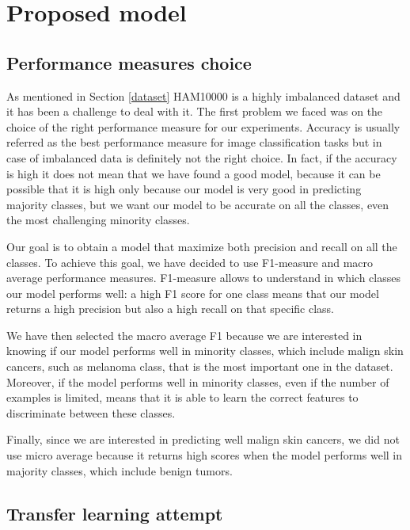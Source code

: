 \section{Proposed model} \label{proposed_model}

	\subsection{Performance measures choice}
		
		As mentioned in Section \ref{dataset} HAM10000 is a highly imbalanced dataset and it has been a challenge to deal with it. The first problem we faced was on the choice of the right performance measure for our experiments. Accuracy is usually referred as the best performance measure for image classification tasks but in case of imbalanced data is definitely not the right choice. In fact, if the accuracy is high it does not mean that we have found a good model, because it can be possible that it is high only because our model is very good in predicting majority classes, but we want our model to be accurate on all the classes, even the most challenging minority classes.
		
		\smallskip
		
		Our goal is to obtain a model that maximize both precision and recall on all the classes.
		To achieve this goal, we have decided to use F1-measure and macro average performance measures. F1-measure allows to understand in which classes our model performs well: a high F1 score for one class means that our model returns a high precision but also a high recall on that specific class. 
		
		\smallskip
		
		We have then selected the macro average F1 because we are interested in knowing if our model performs well in minority classes, which include malign skin cancers, such as melanoma class, that is the most important one in the dataset. 
		Moreover, if the model performs well in minority classes, even if the number of examples is limited, means that it is able to learn the correct features to discriminate between these classes. 
		
		\smallskip
		
		Finally, since we are interested in predicting well malign skin cancers, we did not use micro average because it returns high scores when the model performs well in majority classes, which include benign tumors.
		
	\subsection{Transfer learning attempt}
		
